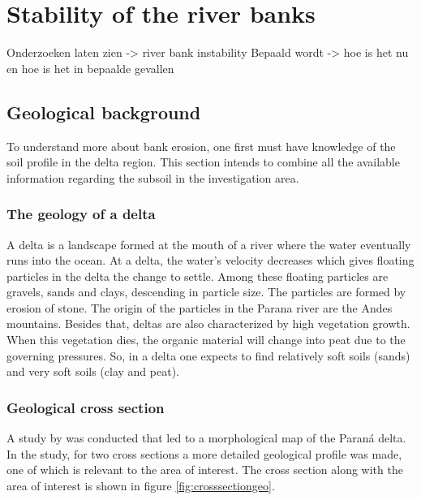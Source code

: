 \chapter{Stability of the river banks}

Onderzoeken laten zien -> river bank instability
Bepaald wordt -> hoe is het nu en hoe is het in bepaalde gevallen



\section{Geological background}
To understand more about bank erosion, one first must have knowledge of the soil profile in the delta region. This section intends to combine all the available information regarding the subsoil in the investigation area.

\subsection{The geology of a delta}
A delta is a landscape formed at the mouth of a river where the water eventually runs into the ocean. At a delta, the water's velocity decreases which gives floating particles in the delta the change to settle. Among these floating particles are gravels, sands and clays, descending in particle size. The particles are formed by erosion of stone. The origin of the particles in the Parana river are the Andes mountains. 
Besides that, deltas are also characterized by high vegetation growth. When this vegetation dies, the organic material will change into peat due to the governing pressures. So, in a delta one expects to find relatively soft soils (sands) and very soft soils (clay and peat).

\subsection{Geological cross section}
A study by \citeauthor{joseluiscavallottoEvolucionCambiosAmbientales2005} was conducted that led to a morphological map of the Paraná delta. In the study, for two cross sections a more detailed geological profile was made, one of which is relevant to the area of interest. The cross section along with the area of interest is shown in figure \ref{fig:crosssectiongeo}.

